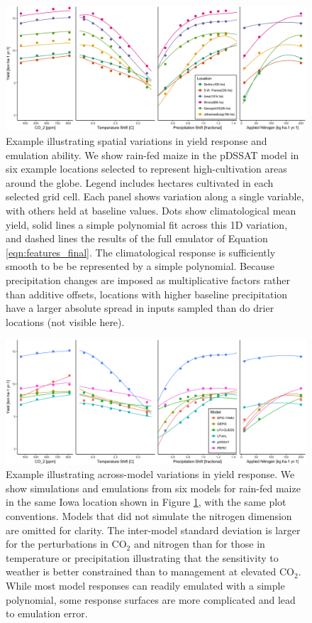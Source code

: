 \documentclass[preprint, 5p, times, twocolumn]{elsarticle}
\begin{document}
\begin{figure}[!h]
\centering
    \includegraphics[width=0.95\linewidth]{figures/regression_areas.png}
    \caption{Example illustrating spatial variations in yield response and emulation ability. We show rain-fed maize in the pDSSAT model in six example locations selected to represent high-cultivation areas around the globe. Legend includes hectares cultivated in each selected grid cell. Each panel shows variation along a single variable, with others held at baseline values. Dots show climatological mean yield, solid lines a simple polynomial fit across this 1D variation, and dashed lines the results of the full emulator of Equation \ref{eqn:features_final}. The climatological response is sufficiently smooth to be be represented by a simple polynomial. Because precipitation changes are imposed as multiplicative factors rather than additive offsets, locations with higher baseline precipitation have a larger absolute spread in inputs sampled than do drier locations (not visible here).}
   \label{fig:regression}
\end{figure}

\begin{figure}[!h]
\centering
    \includegraphics[width=0.95\linewidth]{figures/regression_model.png}
    \caption{Example illustrating across-model variations in yield response. We show simulations and emulations from six models for rain-fed maize in the same Iowa location shown in Figure \ref{fig:regression}, with the same plot conventions. Models that did not simulate the nitrogen dimension are omitted for clarity. The inter-model standard deviation is larger for the perturbations in CO$_2$ and nitrogen than for those in temperature or precipitation illustrating that the sensitivity to weather is better constrained than to management at elevated CO$_2$. While most model responses can readily emulated with a simple polynomial, some response surfaces are more complicated and lead to emulation error.}
   \label{fig:regression_iowa}
\end{figure}
\end{document}
